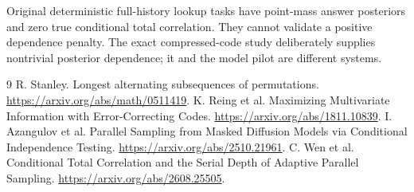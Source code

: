 \documentclass[11pt]{article}
\begin{document}
Original deterministic full-history lookup tasks have point-mass answer posteriors and zero true conditional total correlation. They cannot validate a positive dependence penalty. The exact compressed-code study deliberately supplies nontrivial posterior dependence; it and the model pilot are different systems.

\begin{thebibliography}{9}
 R. Stanley. Longest alternating subsequences of permutations. \url{https://arxiv.org/abs/math/0511419}.
 K. Reing et al. Maximizing Multivariate Information with Error-Correcting Codes. \url{https://arxiv.org/abs/1811.10839}.
 I. Azangulov et al. Parallel Sampling from Masked Diffusion Models via Conditional Independence Testing. \url{https://arxiv.org/abs/2510.21961}.
 C. Wen et al. Conditional Total Correlation and the Serial Depth of Adaptive Parallel Sampling. \url{https://arxiv.org/abs/2608.25505}.
\end{thebibliography}
\end{document}
